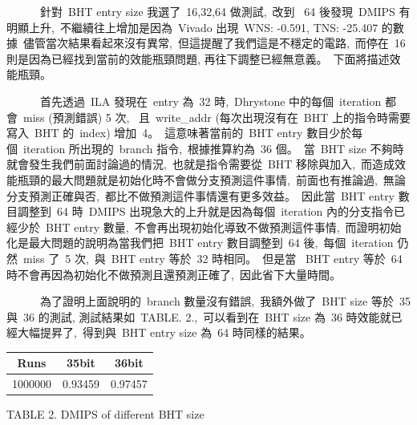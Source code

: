 \documentclass{article}
\begin{document}
\begin{CJK*}{UTF8}{bsmi}
\begin{multicols}{2}
\columnbreak

\begin{flushleft}
    \ \ \ \ \ \ 針對\ BHT entry size 我選了\ 16,32,64 做測試,\
    改到 \ 64 後發現\ DMIPS 有明顯上升,\
    不繼續往上增加是因為\ Vivado 出現\ WNS: -0.591, TNS: -25.407 的數據\
    儘管當次結果看起來沒有異常,\
    但這提醒了我們這是不穩定的電路,\
    而停在\ 16 則是因為已經找到當前的效能瓶頸問題, 再往下調整已經無意義。\
    下面將描述效能瓶頸。\newline

    \ \ \ \ \ \ 首先透過\ ILA 發現在\ entry 為\ 32 時,\
    Dhrystone 中的每個\ iteration 都會\ miss (預測錯誤) 5 次, \
    且\ write\_addr (每次出現沒有在\ BHT 上的指令時需要寫入\ BHT 的\ index) 增加\ 4。\
    這意味著當前的\ BHT entry 數目少於每個\ iteration 所出現的\ branch 指令,\
    根據推算約為\ 36 個。\
    當\ BHT size 不夠時就會發生我們前面討論過的情況,\
    也就是指令需要從\ BHT 移除與加入,\
    而造成效能瓶頸的最大問題就是初始化時不會做分支預測這件事情,\
    前面也有推論過,\
    無論分支預測正確與否,\
    都比不做預測這件事情還有更多效益。\
    因此當\ BHT entry 數目調整到\ 64 時\ DMIPS 出現急大的上升就是因為每個\ iteration 內的分支指令已經少於\ BHT entry 數量,\
    不會再出現初始化導致不做預測這件事情,\
    而證明初始化是最大問題的說明為當我們把\ BHT entry 數目調整到\ 64 後,\
    每個\ iteration 仍然\ miss 了\ 5 次,\
    與\ BHT entry 等於\ 32 時相同。\
    但是當 \ BHT entry 等於\ 64 時不會再因為初始化不做預測且還預測正確了,\
    因此省下大量時間。 
\end{flushleft}

\begin{flushleft}
    \ \ \ \ \ \ 為了證明上面說明的\ branch 數量沒有錯誤,\
    我額外做了\ BHT size 等於\ 35 與\ 36 的測試, 測試結果如\ TABLE. 2.,\
    可以看到在\ BHT size 為\ 36 時效能就已經大幅提昇了,\
    得到與\ BHT entry size 為\ 64 時同樣的結果。
\end{flushleft}

\begin{center}
    \begin{tabular}{||c c c ||} 
     \hline
     Runs & 35bit & 36bit \\ [2ex] 
     \hline\hline
     1000000 & 0.93459 & 0.97457 \\ 
     \hline
    \end{tabular}
\end{center}

\begin{center}
    \small{TABLE 2. DMIPS of different BHT size}\\
\end{center}


\end{multicols}
\end{CJK*}
\end{document}
